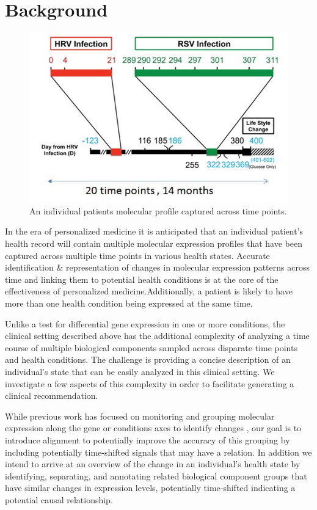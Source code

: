 \documentclass[aps,prd,final,onecolumn,a4paper,10pt]{revtex4}
\begin{document}
\section{Background}
	\begin{figure}[H]
\centering
\includegraphics[scale=0.65]{Introduction.png}
\caption{An individual patients molecular profile captured across time points.}
\label{fig:PatientTimeCourses}
\end{figure}

	In the era of personalized medicine it is anticipated that an individual patient's health record will contain multiple molecular expression profiles that have been captured across multiple time points in various health states. Accurate identification \& representation of changes in molecular expression patterns across time and linking them to potential health conditions is at the core of the effectiveness of personalized medicine.Additionally, a patient is likely to have more than one health condition being expressed at the same time.

  Unlike a test for differential gene expression in one or more conditions, the clinical setting described above has the additional complexity of analyzing a time course of multiple biological components sampled across disparate time points and health conditions. The challenge is providing a concise description of an individual’s state that can be easily analyzed in this clinical setting. We investigate a few aspects of this complexity in order to facilitate generating a clinical recommendation.

  While previous work has focused on monitoring and grouping molecular expression along the gene or conditions axes to identify changes , our goal is to introduce alignment to potentially improve the accuracy of this grouping by including potentially time-shifted signals that may have a relation. In addition we intend to arrive at an overview of the change in an individual’s health state by identifying, separating, and annotating related biological component groups that have similar changes in expression levels, potentially time-shifted indicating a potential causal relationship.
  
\end{document}
